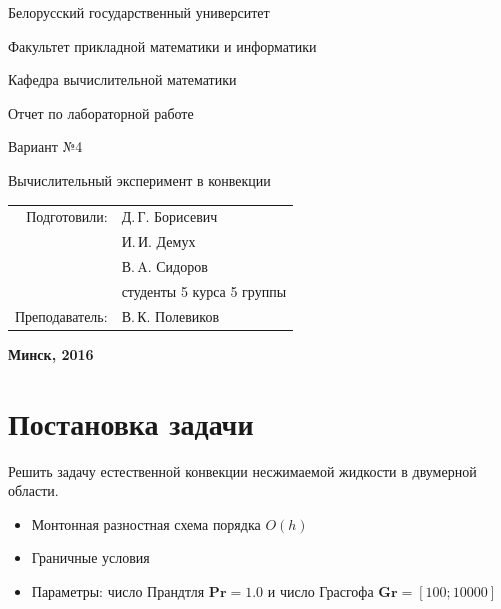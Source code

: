 \documentclass[a4paper, 12pt]{article}
\newcommand{\Pra}{\mathbf{Pr}}
\newcommand{\Gra}{\mathbf{Gr}}
\begin{document}
  \begin{titlepage}
    \begin{center} %
      \bfseries

      {\Large Белорусский государственный университет}

      \vspace{96pt}

      {\large Факультет прикладной математики и информатики}

      \vspace{72pt}

      {\large Кафедра вычислительной математики}

      \vspace{96pt}

      Отчет по лабораторной работе

      \vspace{24pt}

      Вариант №4

      \vspace{24pt}

      {\Large Вычислительный эксперимент в конвекции}

    \end{center}

    \vspace{120pt}

    \begin{flushright}
      \begin{tabular}{rl}
        Подготовили: & Д.\,Г. Борисевич \\
                     & И.\,И. Демух \\
                     & В.\,A. Сидоров \\
                     &студенты 5 курса 5 группы\\
        Преподаватель: & В.\,К. Полевиков \\
      \end{tabular}
    \end{flushright}

    \vfill

    \begin{center}
      \bfseries
      Минск, 2016
    \end{center}
  \end{titlepage}

  \section{Постановка задачи}
    Решить задачу естественной конвекции несжимаемой жидкости в двумерной
    области.
    \begin{itemize}
      \item Монтонная разностная схема порядка $O(h)$
      \item Граничные условия
      \item Параметры: число Прандтля $\Pra=1.0$ и число Грасгофа
        $\Gra=[100;10000]$
    \end{itemize}
\end{document}
